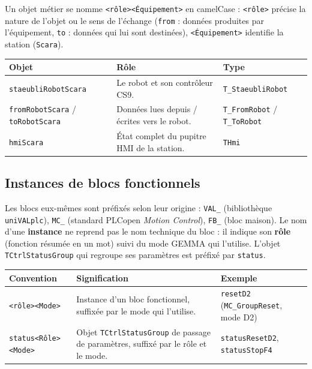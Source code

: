 Un objet métier se nomme \texttt{<rôle><Équipement>} en camelCase : \texttt{<rôle>} précise la
nature de l'objet ou le sens de l'échange (\texttt{from} : données produites par l'équipement,
\texttt{to} : données qui lui sont destinées), \texttt{<Équipement>} identifie la station
(\texttt{Scara}).

\begin{center}
    \begin{tabular}{|p{4.6cm}|p{5.4cm}|p{4.2cm}|}
        \hline
        \textbf{Objet} & \textbf{Rôle} & \textbf{Type} \\
        \hline
        \texttt{staeubliRobotScara} & Le robot et son contrôleur CS9. & \texttt{T\_StaeubliRobot} \\
        \hline
        \texttt{fromRobotScara} / \texttt{toRobotScara} & Données lues depuis / écrites vers le robot. & \texttt{T\_FromRobot} / \texttt{T\_ToRobot} \\
        \hline
        \texttt{hmiScara} & État complet du pupitre HMI de la station. & \texttt{THmi} \\
        \hline
    \end{tabular}
\end{center}

\subsection{Instances de blocs fonctionnels}
\label{secNotationsInstances}

Les blocs eux-mêmes sont préfixés selon leur origine : \texttt{VAL\_} (bibliothèque
\texttt{uniVALplc}), \texttt{MC\_} (standard PLCopen \emph{Motion Control}), \texttt{FB\_} (bloc
maison). Le nom d'une \textbf{instance} ne reprend pas le nom technique du bloc : il indique son
\textbf{rôle} (fonction résumée en un mot) suivi du mode GEMMA qui l'utilise. L'objet
\texttt{TCtrlStatusGroup} qui regroupe ses paramètres est préfixé par \texttt{status}.

\begin{center}
    \begin{tabular}{|p{4.4cm}|p{6cm}|p{3.8cm}|}
        \hline
        \textbf{Convention} & \textbf{Signification} & \textbf{Exemple} \\
        \hline
        \texttt{<rôle><Mode>} & Instance d'un bloc fonctionnel, suffixée par le mode qui l'utilise. & \texttt{resetD2} (\texttt{MC\_GroupReset}, mode D2) \\
        \hline
        \texttt{status<Rôle><Mode>} & Objet \texttt{TCtrlStatusGroup} de passage de paramètres, suffixé par le rôle et le mode. & \texttt{statusResetD2}, \texttt{statusStopF4} \\
        \hline
    \end{tabular}
\end{center}

